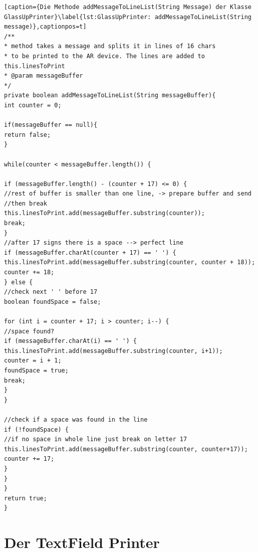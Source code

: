  \begin{lstlisting}
[caption={Die Methode addMessageToLineList(String Message) der Klasse GlassUpPrinter}\label{lst:GlassUpPrinter: addMessageToLineList(String message)},captionpos=t] 
/**
* method takes a message and splits it in lines of 16 chars
* to be printed to the AR device. The lines are added to this.linesToPrint
* @param messageBuffer
*/
private boolean addMessageToLineList(String messageBuffer){
int counter = 0;

if(messageBuffer == null){
return false;
}

while(counter < messageBuffer.length()) {

if (messageBuffer.length() - (counter + 17) <= 0) {
//rest of buffer is smaller than one line, -> prepare buffer and send
//then break
this.linesToPrint.add(messageBuffer.substring(counter));
break;
}
//after 17 signs there is a space --> perfect line
if (messageBuffer.charAt(counter + 17) == ' ') {
this.linesToPrint.add(messageBuffer.substring(counter, counter + 18));
counter += 18;
} else {
//check next ' ' before 17
boolean foundSpace = false;

for (int i = counter + 17; i > counter; i--) {
//space found?
if (messageBuffer.charAt(i) == ' ') {
this.linesToPrint.add(messageBuffer.substring(counter, i+1));
counter = i + 1;
foundSpace = true;
break;
}
}

//check if a space was found in the line
if (!foundSpace) {
//if no space in whole line just break on letter 17
this.linesToPrint.add(messageBuffer.substring(counter, counter+17));
counter += 17;
}
}
}
return true;
}
\end{lstlisting}
\section{Der TextField Printer}